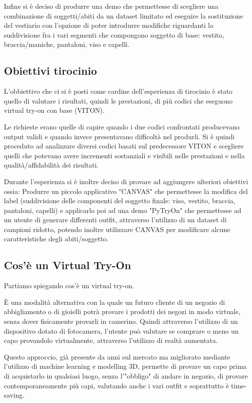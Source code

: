 \documentclass[final, 11pt]{article}
\begin{document}
	Infine si è deciso di produrre una demo che permettesse di scegliere una combinazione di soggetti/abiti da un dataset limitato ed eseguire la sostituzione del vestiario con l’opzione di poter introdurre modifiche riguardanti la suddivisione fra i vari segmenti che compongono soggetto di base: vestito, braccia/maniche, pantaloni, viso e capelli.
	
	\subsection {Obiettivi tirocinio}
	L'obbiettivo che ci si è posti come cardine dell'esperienza di tirocinio è stato quello di valutare i risultati, quindi le prestazioni, di più codici che eseguono virtual try-on con base (VITON).
	
	Le richieste erano quelle di capire quando i due codici confrontati producevano output validi e quando invece presentavano difficoltà nel produrli.
	Si è quindi proceduto ad analizzare diversi codici basati sul predecessore VITON e scegliere quelli che potevano avere incrementi sostanziali e visibili nelle prestazioni e nella qualità/affidabilità dei risultati.
	
	Durante l'esperienza si è inoltre deciso di provare ad aggiungere ulteriori obiettivi ossia: Produrre un piccolo applicativo "CANVAS" che permettesse la modifica del label (suddivisione delle componenti del soggetto finale: viso, vestito, braccia, pantaloni, capelli) e applicarlo poi ad una demo "PyTryOn" che permettesse ad un utente di generare differenti outfit, attraverso l'utilizzo di un dataset di campioni ridotto, potendo inoltre utilizzare CANVAS per modificare alcune caratteristiche degli abiti/soggetto.
	
	
	
	\subsection{Cos'è un Virtual Try-On}
	Partiamo spiegando cos'è un virtual try-on. 
	
	È una modalità alternativa con la quale un futuro cliente di un negozio di abbigliamento o di gioielli potrà provare i prodotti dei negozi in modo virtuale, senza dover fisicamente provarli in camerino. Quindi attraverso l'utilizzo di un dispositivo dotato di fotocamera, l'utente può valutare se comprare o meno un capo provandolo virtualmente, attraverso l'utilizzo di realtà aumentata.
	
	Questo approccio, già presente da anni sul mercato ma migliorato mediante l'utilizzo di machine learning
e modelling 3D, permette di provare un capo prima di acquistarlo in qualsiasi luogo, senza l'"obbligo" di andare in negozio, di provare contemporaneamente più capi, valutando anche i vari outfit e soprattutto è time-saving.
	
\end{document}
